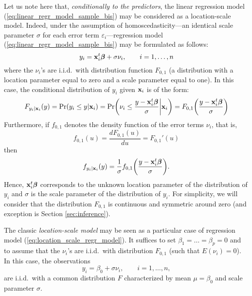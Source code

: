Let us note here that, \emph{conditionally to the predictors}, the linear
regression model (\ref{eq:linear_regr_model_sample_bis}) may be considered as a
location-scale model. Indeed, under the assumption of homoscedasticity---an
identical scale parameter $\sigma$ for each error term
$\varepsilon_{i}$---regression model (\ref{eq:linear_regr_model_sample_bis})
may be formulated as follows:
%
\begin{equation}
    \label{eq:location_scale_regr_model}
    y_{i} = \mathbf x_{i}^t\boldsymbol\beta + \sigma\nu_{i}, 
    \qquad i = 1, \dots, n
\end{equation}
%
where the $\nu_{i}$'s are i.i.d.\ with distribution function $F_{0,1}$ (a
distribution with a location parameter equal to zero and a scale parameter
equal to one). In this case, the conditional distribution of $y_{i}$ given
$\mathbf x_{i}$ is of the form:
%
\begin{equation}
    \label{eq:distr_function_yi}
    F_{y_{i} | \stvec{x}_{i}}(y) 
    = \Pr(y_{i} \leq y | \stvec{x}_{i}) 
    = \Pr\left(\nu_{i} \leq \frac{y - \stvec{x}_{i}^t\boldsymbol\beta}{\sigma} \bigg| \stvec{x}_{i}\right)
    = F_{0,1}\left(\frac{y - \stvec{x}_{i}^t\boldsymbol\beta}{\sigma}\right)
\end{equation}
%
Furthermore, if $f_{0,1}$ denotes the density function of the error terms 
$\nu_{i}$, that is,
\[
    f_{0,1}(u) = \frac{d F_{0,1}(u)}{d u} = F_{0,1}'(u)
\]
then
%
\begin{equation}
    \label{eq:dens_function_yi}
    f_{y_{i} | \stvec{x}_{i}}(y) 
    = \frac{1}{\sigma} f_{0,1}\left(\frac{y - \stvec{x}_{i}^t\boldsymbol\beta}{\sigma}\right).
\end{equation}
%
Hence, $\mathbf x_{i}^t\boldsymbol\beta$ corresponds to the unknown location
parameter of the distribution of $y_{i}$ and $\sigma$ is the scale parameter of
the distribution of $y_{i}$. For simplicity, we will consider that the
distribution $F_{0,1}$ is continuous and symmetric around zero (and exception
is Section \ref{sec:inference}).

\begin{stremark}
The classic \emph{location-scale model} may be seen as a particular case of
regression model (\ref{eq:location_scale_regr_model}). It suffices to set
$\beta_{1} = \dots = \beta_{p} = 0$ and to assume that the $\nu_{i}$'s are
i.i.d.\ with distribution $F_{0,1}$ (such that $E(\nu_{i})=0$). In this case,
the observations
%
\begin{equation}
    \label{eq:location_scale_model}
    y_{i} = \beta_{0} + \sigma\nu_{i},
    \qquad i=1, \dots, n,
\end{equation}
%
are i.i.d.\ with a common distribution $F$ characterized by mean $\mu =
\beta_{0}$ and scale parameter $\sigma$.
\end{stremark}

